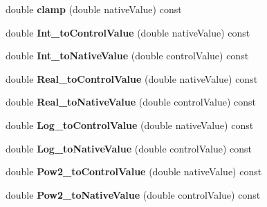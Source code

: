 \begin{DoxyCompactItemize}
\item 
\hypertarget{classDsp_1_1ParamInfo_a43874a484e70b9702b44f883140302fa}{double {\bfseries clamp} (double native\-Value) const }\label{classDsp_1_1ParamInfo_a43874a484e70b9702b44f883140302fa}

\item 
\hypertarget{classDsp_1_1ParamInfo_ac71e99751758d05bb46eb64cd67f89e1}{double {\bfseries Int\-\_\-to\-Control\-Value} (double native\-Value) const }\label{classDsp_1_1ParamInfo_ac71e99751758d05bb46eb64cd67f89e1}

\item 
\hypertarget{classDsp_1_1ParamInfo_adb0cad27a39c38fcf2c1d76aed574a69}{double {\bfseries Int\-\_\-to\-Native\-Value} (double control\-Value) const }\label{classDsp_1_1ParamInfo_adb0cad27a39c38fcf2c1d76aed574a69}

\item 
\hypertarget{classDsp_1_1ParamInfo_afbd0782a3efe5f1dcbf38b74e56a5ab3}{double {\bfseries Real\-\_\-to\-Control\-Value} (double native\-Value) const }\label{classDsp_1_1ParamInfo_afbd0782a3efe5f1dcbf38b74e56a5ab3}

\item 
\hypertarget{classDsp_1_1ParamInfo_a5515b2987a664f0794c1d1f1d05f2884}{double {\bfseries Real\-\_\-to\-Native\-Value} (double control\-Value) const }\label{classDsp_1_1ParamInfo_a5515b2987a664f0794c1d1f1d05f2884}

\item 
\hypertarget{classDsp_1_1ParamInfo_a4a497f48b2dda61287150ff51c8783fc}{double {\bfseries Log\-\_\-to\-Control\-Value} (double native\-Value) const }\label{classDsp_1_1ParamInfo_a4a497f48b2dda61287150ff51c8783fc}

\item 
\hypertarget{classDsp_1_1ParamInfo_ab5267cc6ee496faa5eedd56117ce32c6}{double {\bfseries Log\-\_\-to\-Native\-Value} (double control\-Value) const }\label{classDsp_1_1ParamInfo_ab5267cc6ee496faa5eedd56117ce32c6}

\item 
\hypertarget{classDsp_1_1ParamInfo_aa18713600936045f2a19d18979df1e2a}{double {\bfseries Pow2\-\_\-to\-Control\-Value} (double native\-Value) const }\label{classDsp_1_1ParamInfo_aa18713600936045f2a19d18979df1e2a}

\item 
\hypertarget{classDsp_1_1ParamInfo_a7e7d89915a7d3de802fcbe1cc7be735a}{double {\bfseries Pow2\-\_\-to\-Native\-Value} (double control\-Value) const }\label{classDsp_1_1ParamInfo_a7e7d89915a7d3de802fcbe1cc7be735a}


\end{DoxyCompactItemize}
